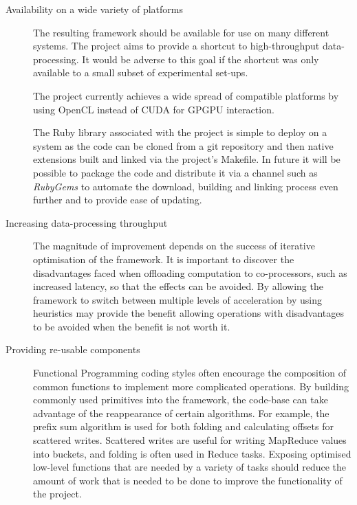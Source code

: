 \begin{description}
  \item[Availability on a wide variety of platforms]
  The resulting framework should be available for use on many different systems. The project aims to provide a shortcut to high-throughput data-processing. It would be adverse to this goal if the shortcut was only available to a small subset of experimental set-ups.

  The project currently achieves a wide spread of compatible platforms by using OpenCL instead of CUDA for GPGPU interaction.

  The Ruby library associated with the project is simple to deploy on a system as the code can be cloned from a git repository and then native extensions built and linked via the project's Makefile. In future it will be possible to package the code and distribute it via a channel such as \emph{RubyGems}\cite{rubygems} to automate the download, building and linking process even further and to provide ease of updating.

  \item[Increasing data-processing throughput]
  The magnitude of improvement depends on the success of iterative optimisation of the framework. It is important to discover the disadvantages faced when offloading computation to co-processors, such as increased latency, so that the effects can be avoided. By allowing the framework to switch between multiple levels of acceleration by using heuristics may provide the benefit allowing operations with disadvantages to be avoided when the benefit is not worth it.

  \item[Providing re-usable components]
  Functional Programming coding styles often encourage the composition of common functions to implement more complicated operations. By building commonly used primitives into the framework, the code-base can take advantage of the reappearance of certain algorithms. For example, the prefix sum algorithm is used for both folding and calculating offsets for scattered writes. Scattered writes are useful for writing MapReduce values into buckets, and folding is often used in Reduce tasks. Exposing optimised low-level functions that are needed by a variety of tasks should reduce the amount of work that is needed to be done to improve the functionality of the project.

\end{description}

